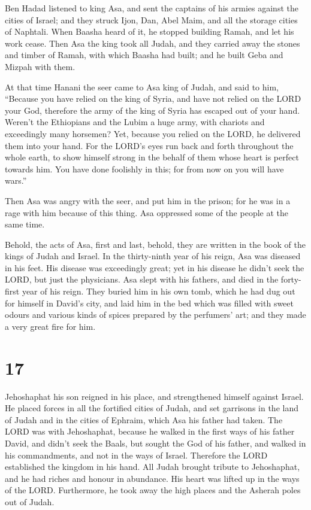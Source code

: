  Ben Hadad listened to king Asa, and sent the captains of
his armies against the cities of Israel; and they struck Ijon, Dan, Abel
Maim, and all the storage cities of Naphtali.  When Baasha
heard of it, he stopped building Ramah, and let his work cease.
 Then Asa the king took all Judah, and they carried away the
stones and timber of Ramah, with which Baasha had built; and he built
Geba and Mizpah with them.

 At that time Hanani the seer came to Asa king of Judah, and
said to him, ``Because you have relied on the king of Syria, and have
not relied on the LORD your God, therefore the army of the king of Syria
has escaped out of your hand.  Weren't the Ethiopians and
the Lubim a huge army, with chariots and exceedingly many horsemen? Yet,
because you relied on the LORD, he delivered them into your hand.
 For the LORD's eyes run back and forth throughout the whole
earth, to show himself strong in the behalf of them whose heart is
perfect towards him. You have done foolishly in this; for from now on
you will have wars.''

 Then Asa was angry with the seer, and put him in the
prison; for he was in a rage with him because of this thing. Asa
oppressed some of the people at the same time.

 Behold, the acts of Asa, first and last, behold, they are
written in the book of the kings of Judah and Israel.  In
the thirty-ninth year of his reign, Asa was diseased in his feet. His
disease was exceedingly great; yet in his disease he didn't seek the
LORD, but just the physicians.  Asa slept with his fathers,
and died in the forty-first year of his reign.  They buried
him in his own tomb, which he had dug out for himself in David's city,
and laid him in the bed which was filled with sweet odours and various
kinds of spices prepared by the perfumers' art; and they made a very
great fire for him.

\hypertarget{section-16}{%
\section{17}\label{section-16}}

 Jehoshaphat his son reigned in his place, and strengthened
himself against Israel.  He placed forces in all the
fortified cities of Judah, and set garrisons in the land of Judah and in
the cities of Ephraim, which Asa his father had taken.  The
LORD was with Jehoshaphat, because he walked in the first ways of his
father David, and didn't seek the Baals,  but sought the God
of his father, and walked in his commandments, and not in the ways of
Israel.  Therefore the LORD established the kingdom in his
hand. All Judah brought tribute to Jehoshaphat, and he had riches and
honour in abundance.  His heart was lifted up in the ways of
the LORD. Furthermore, he took away the high places and the Asherah
poles out of Judah.


